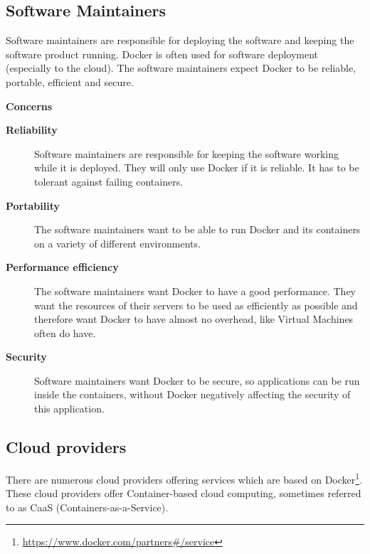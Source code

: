 \subsection*{Software Maintainers}
Software maintainers are responsible for deploying the software and keeping the software product running. Docker is often used for software deployment (especially to the cloud). %
The software maintainers expect Docker to be reliable, portable, efficient and secure.

\textbf{Concerns}
\begin{description}


\item[\textbf{Reliability}] Software maintainers are responsible for keeping the software working while it is deployed. They will only use Docker if it is reliable. It has to be tolerant against failing containers.

\item[\textbf{Portability}] The software maintainers want to be able to run Docker and its containers on a variety of different environments.

\item[\textbf{Performance efficiency}] The software maintainers want Docker to have a good performance. They want the resources of their servers to be used as efficiently as possible and therefore want Docker to have almost no overhead, like Virtual Machines often do have.


\item[\textbf{Security}] Software maintainers want Docker to be secure, so applications can be run inside the containers, without Docker negatively affecting the security of this application.


\end{description}



\subsection*{Cloud providers}
There are numerous cloud providers offering services which are based on Docker\footnote{\url{https://www.docker.com/partners\#/service}}. These cloud providers offer Container-based cloud computing, sometimes referred to as CaaS (Containers-as-a-Service).


